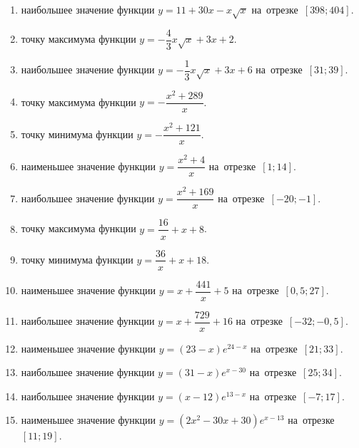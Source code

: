\documentclass[a4paper,10pt]{article}
\begin{document}
\begin{enumerate}
\item {} наибольшее значение функции $y=11+30x -x\sqrt{x}$ на~отрезке~$\left[398;404\right]$.

\item {} точку максимума функции $y=-\dfrac{4}{3}x\sqrt{x} +3x+2$.

\item {} наибольшее значение функции $y=-\dfrac{1}{3}x\sqrt{x} +3x+6$ на~отрезке~$\left[31;39\right]$.

\item {} точку максимума функции $y=-\dfrac{x^2 +289}{x}$.

\item {} точку минимума функции $y=-\dfrac{x^2 +121}{x}$.

\item {} наименьшее значение функции $y=\dfrac{x^2 +4}{x}$ на~отрезке~$\left[1;14\right]$.

\item {} наибольшее значение функции $y=\dfrac{x^2 +169}{x}$ на~отрезке~$\left[-20;-1\right]$.

\item {} точку максимума функции $y=\dfrac{16}{x} +x+8$.

\item {} точку минимума функции $y=\dfrac{36}{x} +x+18$.

\item {} наименьшее значение функции $y=x+\dfrac{441}{x} +5$ на~отрезке~$\left[0,5;27\right]$.

\item {} наибольшее значение функции $y=x+\dfrac{729}{x} +16$ на~отрезке~$\left[-32;-0,5\right]$.

\item {} наименьшее значение функции $y=\left(23-x\right)e^{24-x}$ на~отрезке~$\left[21;33\right]$.

\item {} наибольшее значение функции $y=\left(31-x\right)e^{x-30}$ на~отрезке~$\left[25;34\right]$.

\item {} наибольшее значение функции $y=\left(x-12\right)e^{13-x}$ на~отрезке~$\left[-7;17\right]$.

\item {} наименьшее значение функции $y=\left(2x^2 -30x +30\right)e^{x -13}$ на~отрезке~$\left[11;19\right]$.


\end{enumerate}
\end{document}
